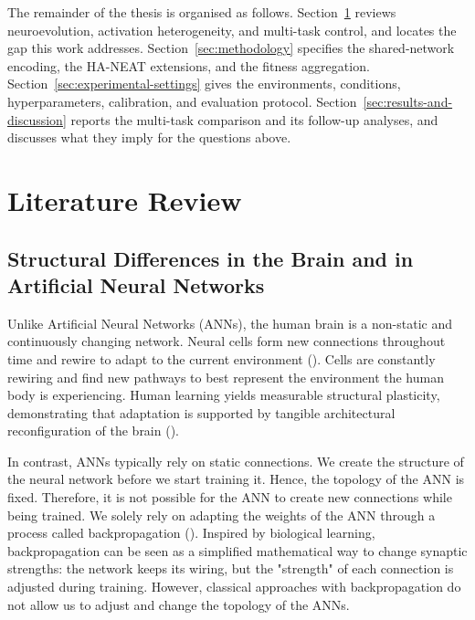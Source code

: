 \documentclass[12pt]{article}
\begin{document}
The remainder of the thesis is organised as follows.
Section~\ref{sec:literature-review} reviews neuroevolution, activation heterogeneity, and multi-task control, and locates the gap this work addresses.
Section~\ref{sec:methodology} specifies the shared-network encoding, the HA-NEAT extensions, and the fitness aggregation.
Section~\ref{sec:experimental-settings} gives the environments, conditions, hyperparameters, calibration, and evaluation protocol.
Section~\ref{sec:results-and-discussion} reports the multi-task comparison and its follow-up analyses, and discusses what they imply for the questions above.

\newpage
\section{Literature Review}
\label{sec:literature-review}


\subsection{Structural Differences in the Brain and in Artificial Neural Networks}
\label{subsec:structural-differences-in-the-brain-and}


Unlike Artificial Neural Networks (ANNs), the human brain is a non-static and continuously changing network.
Neural cells form new connections throughout time and rewire to adapt to the current environment (\cite{pascualleone_plastic_2005,holtmaat_experience-dependent_2009}).
Cells are constantly rewiring and find new pathways to best represent the environment the human body is experiencing.
Human learning yields measurable structural plasticity, demonstrating that adaptation is supported by tangible architectural reconfiguration of the brain (\cite{draganski_changes_2004}).

In contrast, ANNs typically rely on static connections.
We create the structure of the neural network before we start training it.
Hence, the topology of the ANN is fixed.
Therefore, it is not possible for the ANN to create new connections while being trained.
We solely rely on adapting the weights of the ANN through a process called backpropagation (\cite{rumelhart_learning_1986}).
Inspired by biological learning, backpropagation can be seen as a simplified mathematical way to change synaptic strengths: the network keeps its wiring, but the "strength" of each connection is adjusted during training.
However, classical approaches with backpropagation do not allow us to adjust and change the topology of the ANNs.
\end{document}
